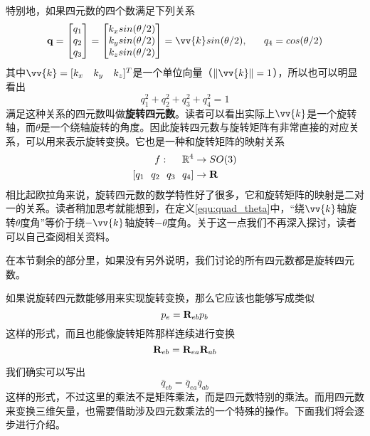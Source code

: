 \documentclass[11pt]{article}
\begin{document}
特别地，如果四元数的四个数满足下列关系
\begin{equation}\label{equ:quad_theta}
      \mathbf{q} = 
      \begin{bmatrix}
        q_1\\
        q_2\\
        q_3\\
      \end{bmatrix} =
      \begin{bmatrix}
        k_x sin(\theta/2)\\
        k_y sin(\theta/2)\\
        k_z sin(\theta/2)\\
      \end{bmatrix} =  \vv{k} sin(\theta/2),
      \ \ \ \ \ 
      q_4 = cos(\theta/2)
\end{equation}
其中$\vv{k} = [k_x \ \ \ k_y \ \ \ k_z]^T$是一个单位向量（$\| \vv{k}\| = 1$），所以也可以明显看出
$$
q_1^2+q_2^2+q_3^2+q_4^2 = 1
$$
满足这种关系的四元数叫做\textbf{旋转四元数}。读者可以看出实际上$\vv{k}$是一个旋转轴，而$\theta$是一个绕轴旋转的角度。因此旋转四元数与旋转矩阵有非常直接的对应关系，可以用来表示旋转变换。它也是一种和旋转矩阵的映射关系
\begin{align*}
 f: \ \ \ \ \mathbb{R}^4 & \rightarrow SO(3) \\
	[q_1 \ \ q_2 \ \ q_3 \ \ q_4] & \rightarrow {\bf R}	
\end{align*}
相比起欧拉角来说，旋转四元数的数学特性好了很多，它和旋转矩阵的映射是二对一的关系。读者稍加思考就能想到，在定义\ref{equ:quad_theta}中，“绕$\vv{k}$轴旋转$\theta$度角”等价于绕$-\vv{k}$轴旋转$-\theta$度角。关于这一点我们不再深入探讨，读者可以自己查阅相关资料。

在本节剩余的部分里，如果没有另外说明，我们讨论的所有四元数都是旋转四元数。

如果说旋转四元数能够用来实现旋转变换，那么它应该也能够写成类似
$$
p_e = {\bf R}_{eb}p_b
$$
这样的形式，而且也能像旋转矩阵那样连续进行变换
$$
{\bf R}_{eb} = {\bf R}_{ea}{\bf R}_{ab}
$$

我们确实可以写出
$$
\bar{q}_{eb} = \bar{q}_{ea}\bar{q}_{ab}
$$
这样的形式，不过这里的乘法不是矩阵乘法，而是四元数特别的乘法。而用四元数来变换三维矢量，也需要借助涉及四元数乘法的一个特殊的操作。下面我们将会逐步进行介绍。
\end{document}
